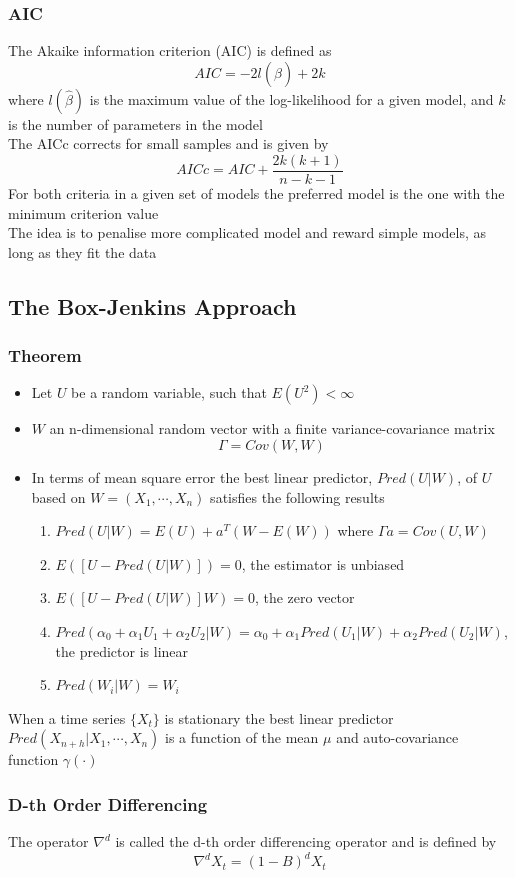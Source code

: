 \documentclass[11pt]{article}
\begin{document}
\subsubsection{AIC}
The Akaike information criterion (AIC) is defined as \[AIC=-2 l(\hat{\beta})+2k\]    
where $l(\hat{\beta})$ is the maximum value of the log-likelihood for a given model, and $k$ is the number of parameters in the model \\
The AICc corrects for small samples and is given by 
\[AICc = AIC + \frac{2k(k+1)}{n-k-1}\]   
For both criteria in a given set of models the preferred model is the one with the minimum criterion value \\
The idea is to penalise more complicated model and reward simple models, as long as they fit the data 
\subsection{The Box-Jenkins Approach}
\subsubsection*{Theorem}
\begin{itemize}
    \item Let $U$ be a random variable, such that $E(U^2)<\infty$ 
    \item $W$ an n-dimensional random vector with a finite variance-covariance matrix \[\Gamma=Cov(W,W)\]    
    \item In terms of mean square error the best linear predictor, $Pred(U|W)$, of $U$ based on $W=(X_1,\cdots,X_n)$ satisfies the following results 
    \begin{enumerate}
        \item $Pred(U|W) = E(U) + a^T(W-E(W))$ where $\Gamma a = Cov(U,W)$
        \item $E([U-Pred(U|W)]) = 0$, the estimator is unbiased
        \item $E([U-Pred(U|W)]W) = 0$, the zero vector
        \item $Pred(\alpha_0+\alpha_1U_1+\alpha_2U_2|W)=\alpha_0+\alpha_1Pred(U_1|W)+\alpha_2Pred(U_2|W)$, the predictor is linear
        \item $Pred(W_i|W)=W_i$
    \end{enumerate}
\end{itemize}
When a time series $\{X_t\}$ is stationary the best linear predictor $Pred(X_{n+h}|X_1,\cdots,X_n)$ is a function of the mean $\mu$ and auto-covariance function $\gamma(\cdot)$
\subsubsection{D-th Order Differencing}
The operator $\nabla^d$ is called the d-th order differencing operator and is defined by 
\[\nabla^dX_t = (1-B)^dX_t\] 
\end{document}
